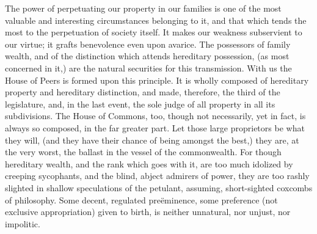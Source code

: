 The power of perpetuating our property in our families is one of the most valuable and interesting circumstances belonging to it, and that which tends the most to the perpetuation of society itself. It makes our weakness subservient to our virtue; it grafts benevolence even upon avarice. The possessors of family wealth, and of the distinction which attends hereditary possession, (as most concerned in it,) are the natural securities for this transmission. With us the House of Peers is formed upon this principle. It is wholly composed of hereditary property and hereditary distinction, and made, therefore, the third of the legislature, and, in the last event, the sole judge of all property in all its subdivisions. The House of Commons, too, though not necessarily, yet in fact, is always so composed, in the far greater part. Let those large proprietors be what they will, (and they have their chance of being amongst the best,) they are, at the very worst, the ballast in the vessel of the commonwealth. For though hereditary wealth, and the rank which goes with it, are too much idolized by creeping sycophants, and the blind, abject admirers of power, they are too rashly slighted in shallow speculations of the petulant, assuming, short-sighted coxcombs of philosophy. Some decent, regulated preëminence, some preference (not exclusive appropriation) given to birth, is neither unnatural, nor unjust, nor impolitic.

